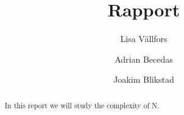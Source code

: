 \documentclass[a4paper]{report}
\title{Rapport}
\author{Lisa Vällfors \and Adrian Becedas \and Joakim Blikstad}
\begin{document}
\maketitle

\begin{abstract}
    In this report we will study the complexity of N.
\end{abstract}
\end{document}
